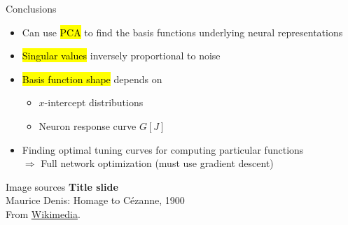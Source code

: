\documentclass[handout,aspectratio=169]{beamer}
\begin{document}
	\begin{frame}{Conclusions}
		\begin{itemize}
			\setlength{\itemsep}{0.5cm}
			\item Can use \hl{PCA} to find the basis functions underlying neural representations
			\item \hl{Singular values} inversely proportional to noise
			\item \hl{Basis function shape} depends on\\[0.25cm]
			\begin{itemize}
				\setlength{\itemsep}{0.25cm}
				\item $x$-intercept distributions
				\item Neuron response curve $G[J]$
			\end{itemize}
			\item Finding optimal tuning curves for computing particular functions\\
			$\Rightarrow$ Full network optimization (must use gradient descent)
		\end{itemize}
	\end{frame}

	\backupbegin

	\begin{frame}[noframenumbering]{Image sources}
		\small
		\textbf{Title slide}\\Maurice Denis: Homage to Cézanne, 1900\\From \href{https://commons.wikimedia.org/wiki/File:Maurice_Denis_Homage_to_Cezanne_1900.jpg}{Wikimedia}.
	\end{frame}

	\backupend
	
\end{document}
